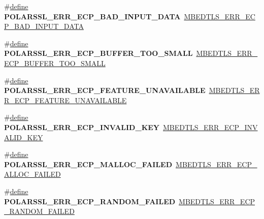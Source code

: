 \begin{DoxyCompactItemize}
\item 
\mbox{\label{compat-1_83_8h_a59e5b00eddc35acbb507340379c4d056}} 
\#\hyperlink{structdefine}{define} {\bfseries P\+O\+L\+A\+R\+S\+S\+L\+\_\+\+E\+R\+R\+\_\+\+E\+C\+P\+\_\+\+B\+A\+D\+\_\+\+I\+N\+P\+U\+T\+\_\+\+D\+A\+TA}~\hyperlink{ecp_8h_abcd6ff5c88f83a731383d344b56131f3}{M\+B\+E\+D\+T\+L\+S\+\_\+\+E\+R\+R\+\_\+\+E\+C\+P\+\_\+\+B\+A\+D\+\_\+\+I\+N\+P\+U\+T\+\_\+\+D\+A\+TA}
\item 
\mbox{\label{compat-1_83_8h_a5dde870beebeca665d636398cd084fba}} 
\#\hyperlink{structdefine}{define} {\bfseries P\+O\+L\+A\+R\+S\+S\+L\+\_\+\+E\+R\+R\+\_\+\+E\+C\+P\+\_\+\+B\+U\+F\+F\+E\+R\+\_\+\+T\+O\+O\+\_\+\+S\+M\+A\+LL}~\hyperlink{ecp_8h_a40adc3b18cac6225a491c07829a49b7c}{M\+B\+E\+D\+T\+L\+S\+\_\+\+E\+R\+R\+\_\+\+E\+C\+P\+\_\+\+B\+U\+F\+F\+E\+R\+\_\+\+T\+O\+O\+\_\+\+S\+M\+A\+LL}
\item 
\mbox{\label{compat-1_83_8h_a87be7bf7e5b042e8ee3b73dbe5f3cc3a}} 
\#\hyperlink{structdefine}{define} {\bfseries P\+O\+L\+A\+R\+S\+S\+L\+\_\+\+E\+R\+R\+\_\+\+E\+C\+P\+\_\+\+F\+E\+A\+T\+U\+R\+E\+\_\+\+U\+N\+A\+V\+A\+I\+L\+A\+B\+LE}~\hyperlink{ecp_8h_aa5a0e1548717d603ba5782c8ab6f5c24}{M\+B\+E\+D\+T\+L\+S\+\_\+\+E\+R\+R\+\_\+\+E\+C\+P\+\_\+\+F\+E\+A\+T\+U\+R\+E\+\_\+\+U\+N\+A\+V\+A\+I\+L\+A\+B\+LE}
\item 
\mbox{\label{compat-1_83_8h_a200efec3d662151ea19bcd730807c769}} 
\#\hyperlink{structdefine}{define} {\bfseries P\+O\+L\+A\+R\+S\+S\+L\+\_\+\+E\+R\+R\+\_\+\+E\+C\+P\+\_\+\+I\+N\+V\+A\+L\+I\+D\+\_\+\+K\+EY}~\hyperlink{ecp_8h_a20464525ea74ab8fcca9f59a12f5dc4b}{M\+B\+E\+D\+T\+L\+S\+\_\+\+E\+R\+R\+\_\+\+E\+C\+P\+\_\+\+I\+N\+V\+A\+L\+I\+D\+\_\+\+K\+EY}
\item 
\mbox{\label{compat-1_83_8h_a01a0e6796f75c7bdd1a41312c4fa60c1}} 
\#\hyperlink{structdefine}{define} {\bfseries P\+O\+L\+A\+R\+S\+S\+L\+\_\+\+E\+R\+R\+\_\+\+E\+C\+P\+\_\+\+M\+A\+L\+L\+O\+C\+\_\+\+F\+A\+I\+L\+ED}~\hyperlink{ecp_8h_a048bea0521e7928f75a6259a8fcbfecb}{M\+B\+E\+D\+T\+L\+S\+\_\+\+E\+R\+R\+\_\+\+E\+C\+P\+\_\+\+A\+L\+L\+O\+C\+\_\+\+F\+A\+I\+L\+ED}
\item 
\mbox{\label{compat-1_83_8h_a8de4c3d074d63c08f314012b604c98c8}} 
\#\hyperlink{structdefine}{define} {\bfseries P\+O\+L\+A\+R\+S\+S\+L\+\_\+\+E\+R\+R\+\_\+\+E\+C\+P\+\_\+\+R\+A\+N\+D\+O\+M\+\_\+\+F\+A\+I\+L\+ED}~\hyperlink{ecp_8h_a484c796d0d97513809f6042e51b42957}{M\+B\+E\+D\+T\+L\+S\+\_\+\+E\+R\+R\+\_\+\+E\+C\+P\+\_\+\+R\+A\+N\+D\+O\+M\+\_\+\+F\+A\+I\+L\+ED}

\end{DoxyCompactItemize}
